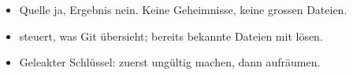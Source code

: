 \begin{zusammenfassung}
\begin{itemize}[nosep]
  \item Quelle ja, Ergebnis nein. Keine Geheimnisse, keine grossen Dateien.
  \item {} steuert, was Git übersieht; bereits bekannte Dateien mit  lösen.
  \item Geleakter Schlüssel: zuerst ungültig machen, dann aufräumen.
\end{itemize}
\end{zusammenfassung}
